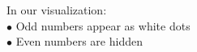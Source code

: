 \documentclass[preview]{standalone}
\begin{document}
\begin{center}
In our visualization: \\$\bullet$ Odd numbers appear as white dots \\$\bullet$ Even numbers are hidden
\end{center}
\end{document}
